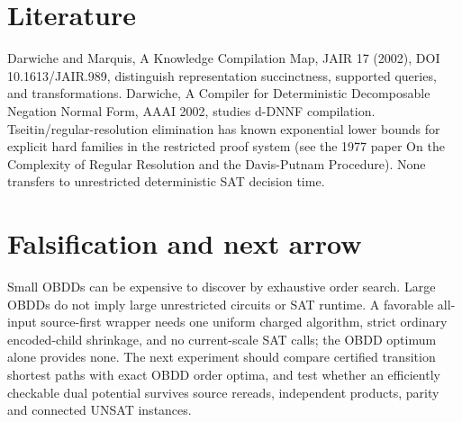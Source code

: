 \documentclass{article}
\begin{document}
\section*{Literature}
Darwiche and Marquis, A Knowledge Compilation Map, JAIR 17 (2002), DOI 10.1613/JAIR.989, distinguish representation succinctness, supported queries, and transformations. Darwiche, A Compiler for Deterministic Decomposable Negation Normal Form, AAAI 2002, studies d-DNNF compilation. Tseitin/regular-resolution elimination has known exponential lower bounds for explicit hard families in the restricted proof system (see the 1977 paper On the Complexity of Regular Resolution and the Davis-Putnam Procedure). None transfers to unrestricted deterministic SAT decision time.
\section*{Falsification and next arrow}
Small OBDDs can be expensive to discover by exhaustive order search. Large OBDDs do not imply large unrestricted circuits or SAT runtime. A favorable all-input source-first wrapper needs one uniform charged algorithm, strict ordinary encoded-child shrinkage, and no current-scale SAT calls; the OBDD optimum alone provides none. The next experiment should compare certified transition shortest paths with exact OBDD order optima, and test whether an efficiently checkable dual potential survives source rereads, independent products, parity and connected UNSAT instances.
\end{document}
